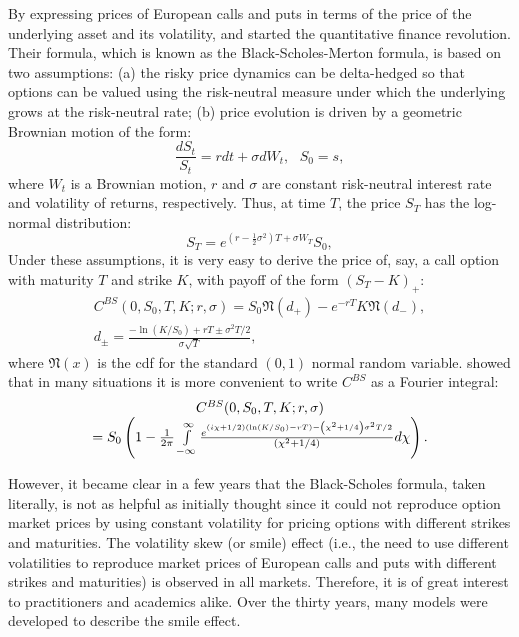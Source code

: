 \documentclass{article}
\begin{document}
By expressing prices of European calls and puts in terms of the price of the
underlying asset and its volatility, \cite{Black1973} and \cite{Merton1973}
started the quantitative finance revolution. Their formula, which is known
as the Black-Scholes-Merton formula, is based on two assumptions: (a) the
risky price dynamics can be delta-hedged so that options can be valued using
the risk-neutral measure under which the underlying grows at the
risk-neutral rate; (b) price evolution is driven by a geometric Brownian
motion of the form:%
\begin{equation}
\frac{dS_{t}}{S_{t}}=rdt+\sigma dW_{t},\ \ \ S_{0}=s,  \label{Eq1}
\end{equation}%
where $W_{t}$ is a Brownian motion, $r$ and $\sigma $ are constant
risk-neutral interest rate and volatility of returns, respectively. Thus, at
time $T$, the price $S_{T}$ has the log-normal distribution:%
\begin{equation}
S_{T}=e^{\left( r-\frac{1}{2}\sigma ^{2}\right) T+\sigma W_{T}}S_{0},
\label{Eq2}
\end{equation}%
Under these assumptions, it is very easy to derive the price of, say, a call
option with maturity $T$ and strike $K$, with payoff of the form $\left(
S_{T}-K\right) _{+}$:%
\begin{equation}
\begin{array}{c}
C^{BS}(0,S_{0},T,K;r,\sigma )=S_{0}\mathfrak{N}\left( d_{+}\right) -e^{-rT}K%
\mathfrak{N}\left( d_{-}\right) , \\ 
d_{\pm }=\frac{-\ln \left( K/S_{0}\right) +rT\pm \sigma ^{2}T/2}{\sigma 
\sqrt{T}},%
\end{array}
\label{Eq3}
\end{equation}%
where $\mathfrak{N}(x)$ is the cdf for the standard $\left( 0,1\right) $
normal random variable. \cite{Lipton2002a} showed that in many situations it
is more convenient to write $C^{BS}$ as a Fourier integral:%
\begin{equation}
\begin{array}{c}
C^{BS}(0,S_{0},T,K;r,\sigma ) \\ 
=S_{0}\left( 1-\frac{1}{2\pi }\int\limits_{-\infty }^{\infty }\frac{%
e^{\left( i\chi +1/2\right) \left( \ln \left( K/S_{0}\right) -rT\right)
-\left( \chi ^{2}+1/4\right) \sigma ^{2}T/2}}{\left( \chi ^{2}+1/4\right) }%
d\chi \right) .%
\end{array}
\label{Eq3a}
\end{equation}

However, it became clear in a few years that the Black-Scholes formula,
taken literally, is not as helpful as initially thought since it could not
reproduce option market prices by using constant volatility for pricing
options with different strikes and maturities. The volatility skew (or
smile) effect (i.e., the need to use different volatilities to reproduce
market prices of European calls and puts with different strikes and
maturities) is observed in all markets. Therefore, it is of great interest
to practitioners and academics alike. Over the thirty years, many models
were developed to describe the smile effect.
\end{document}
